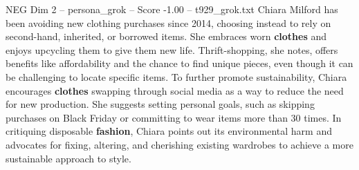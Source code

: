 \begin{textsample}{NEG Dim 2 – persona\_grok – Score -1.00 – t929\_grok.txt}  \label{ex:f2_neg_021}
Chiara Milford has been avoiding new clothing purchases since 2014, choosing instead to rely on second-hand, inherited, or borrowed items.
She embraces worn \textbf{clothes} and enjoys upcycling them to give them new life.
Thrift-shopping, she notes, offers benefits like affordability and the chance to find unique pieces, even though it can be challenging to locate specific items.
To further promote sustainability, Chiara encourages \textbf{clothes} swapping through social media as a way to reduce the need for new production.
She suggests setting personal goals, such as skipping purchases on Black Friday or committing to wear items more than 30 times.
In critiquing disposable \textbf{fashion}, Chiara points out its environmental harm and advocates for fixing, altering, and cherishing existing wardrobes to achieve a more sustainable approach to style.

\end{textsample}
